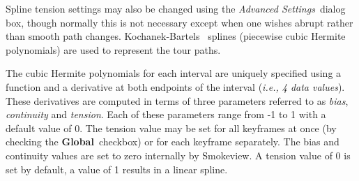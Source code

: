 \documentclass[11pt,twoside]{book}
\begin{document}
Spline tension settings may also be changed using the {\em
Advanced Settings}\ dialog box, though normally this is not
necessary except when one wishes abrupt rather than smooth path
changes. Kochanek-Bartels~\cite{Moller:02} splines (piecewise cubic
Hermite polynomials) are used to represent the tour paths.

The cubic Hermite polynomials for each interval are uniquely
specified using a function and a derivative at both endpoints of
the interval ({\em i.e., 4 data values}).  These derivatives are
computed in terms of three parameters referred to as {\em bias},
{\em continuity} and {\em tension}. Each of these parameters range
from -1 to 1 with a default value of 0. The tension value may be
set for all keyframes at once (by checking the {\bf Global}\
checkbox) or for each keyframe separately.  The bias and
continuity values are set to zero internally by Smokeview.  A
tension value of 0 is set by default, a value of 1 results in a
linear spline.
\end{document}
